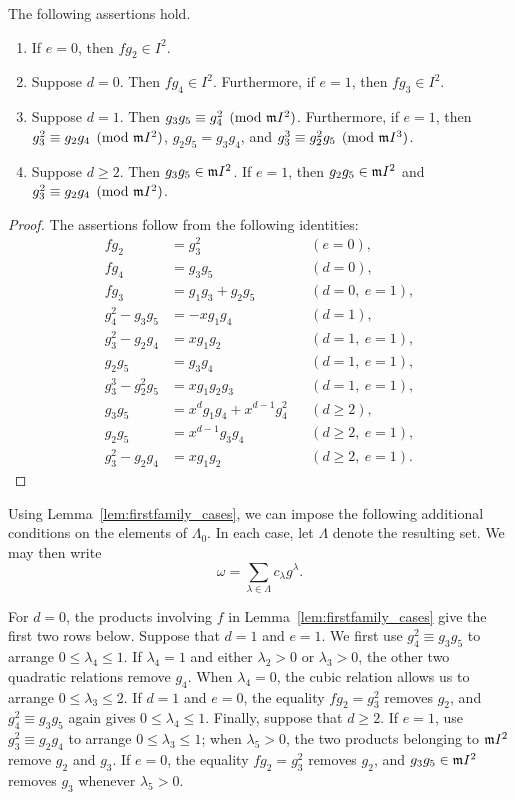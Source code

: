 \begin{lemma}\label{lem:firstfamily_cases}
	The following assertions hold.
	\begin{enumerate}
		\item If $e=0$, then $fg_2 \in I^2$.
		\item Suppose $d=0$. Then $fg_4 \in I^2$. Furthermore, if $e=1$, then $fg_3 \in I^2$.
		\item Suppose $d=1$. Then $g_3g_5 \equiv g_4^2 \pmod{\mathfrak m I^2}$. Furthermore, if $e=1$, then $g_3^2 \equiv g_2g_4 \pmod{\mathfrak m I^2}$, $g_2g_5 = g_3g_4$, and
		$g_3^3\equiv g_2^2g_5\pmod{\mathfrak m I^3}$.
		\item Suppose $d\geq2$. Then $g_3g_5\in\mathfrak m I^2$.  If $e=1$, then $g_2g_5\in\mathfrak m I^2$ and $g_3^2\equiv g_2g_4\pmod{\mathfrak m I^2}$.
	\end{enumerate}
\end{lemma}

\begin{proof}
The assertions follow from the following identities:
\begin{align*}
 fg_2&=g_3^2 &&(e=0),\\
 fg_4&=g_3g_5 &&(d=0),\\
 fg_3&=g_1g_3+g_2g_5 &&(d=0,\ e=1),\\
 g_4^2-g_3g_5&=-xg_1g_4 &&(d=1),\\
 g_3^2-g_2g_4&=xg_1g_2 &&(d=1,\ e=1),\\
 g_2g_5&=g_3g_4 &&(d=1,\ e=1),\\
 g_3^3-g_2^2g_5&=xg_1g_2g_3 &&(d=1,\ e=1),\\
 g_3g_5&=x^dg_1g_4+x^{d-1}g_4^2 &&(d\geq2),\\
 g_2g_5&=x^{d-1}g_3g_4 &&(d\geq2,\ e=1),\\
 g_3^2-g_2g_4&=xg_1g_2 &&(d\geq2,\ e=1).
\end{align*}
\end{proof}

Using Lemma~\ref{lem:firstfamily_cases}, we can impose the
following additional conditions on the elements of $\Lambda_0$.  In each
case, let $\Lambda$ denote the resulting set.  We may then write
$$\omega=\sum_{\lambda\in\Lambda}c_\lambda g^\lambda.$$

For $d=0$, the products involving $f$ in Lemma~\ref{lem:firstfamily_cases}
give the first two rows below.  Suppose that $d=1$ and $e=1$.  We first use
$g_4^2\equiv g_3g_5$ to arrange $0\leq\lambda_4\leq1$.  If $\lambda_4=1$
and either $\lambda_2>0$ or $\lambda_3>0$, the other two quadratic relations remove
$g_4$.  When $\lambda_4=0$, the cubic relation allows us to arrange
$0\leq\lambda_3\leq2$.  If $d=1$ and $e=0$, the equality $fg_2=g_3^2$
removes $g_2$, and $g_4^2\equiv g_3g_5$ again gives
$0\leq\lambda_4\leq1$.  Finally, suppose that $d\geq2$.  If $e=1$, use
$g_3^2\equiv g_2g_4$ to arrange $0\leq\lambda_3\leq1$; when $\lambda_5>0$,
the two products belonging to $\mathfrak m I^2$ remove $g_2$ and $g_3$.  If $e=0$,
the equality $fg_2=g_3^2$ removes $g_2$, and $g_3g_5\in\mathfrak m I^2$ removes
$g_3$ whenever $\lambda_5>0$.

